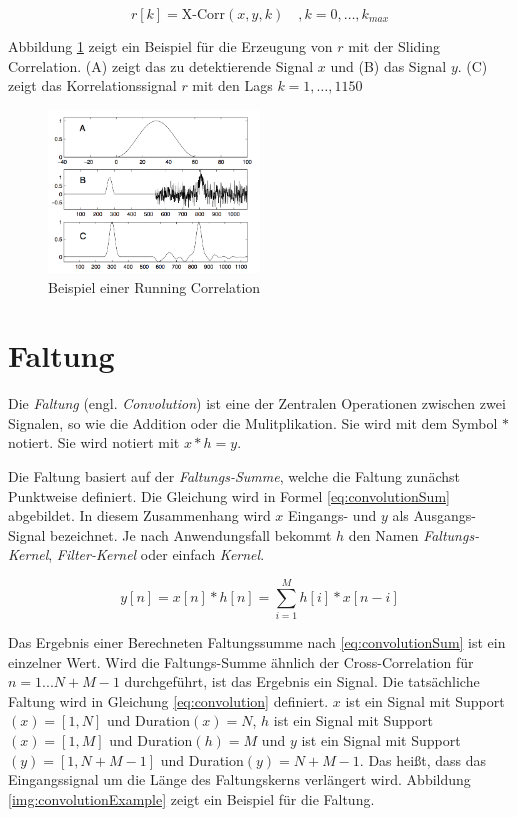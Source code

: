 \begin{equation}
r[k] = \text{X-Corr}(x,y,k) \quad, k = 0 , \ldots , k_{max} 
\label{eq:runningCorrelation}
\end{equation}

Abbildung \ref{img:slidingCorrelation} zeigt ein Beispiel für die Erzeugung von $r$ mit der Sliding Correlation. (A) zeigt das zu detektierende Signal $x$ und (B) das Signal $y$. (C) zeigt das Korrelationssignal $r$ mit den Lags $k = 1, \ldots ,1150$ \cite[S. 47 - 48]{dspMichigan}

\begin{figure}[h]
	\centering
	\includegraphics[width=0.5\textwidth]{bilder/slidingCorrelation.png}
	\caption{Beispiel einer Running Correlation}
	\label{img:slidingCorrelation}
\end{figure}

\section{Faltung}

Die \emph{Faltung} (engl. \emph{Convolution}) ist eine der Zentralen Operationen zwischen zwei Signalen, so wie die Addition oder die Mulitplikation. Sie wird mit dem Symbol $*$ notiert. Sie wird notiert mit $x* h = y$. 

Die Faltung basiert auf der \emph{Faltungs-Summe}, welche die Faltung zunächst Punktweise definiert. Die Gleichung wird in Formel \ref{eq:convolutionSum} abgebildet. In diesem Zusammenhang wird $x$ Eingangs- und $y$ als Ausgangs-Signal bezeichnet. Je nach Anwendungsfall bekommt $h$ den Namen \emph{Faltungs-Kernel}, \emph{Filter-Kernel} oder einfach \emph{Kernel}. \cite[S. 107-108]{dspGuide}

\begin{equation}
y[n] = x[n] * h[n] = \sum_{i=1}^{M} h[i] * x[n-i]
\label{eq:convolutionSum}
\end{equation}

Das Ergebnis einer Berechneten Faltungssumme nach \ref{eq:convolutionSum} ist ein einzelner Wert. Wird die Faltungs-Summe ähnlich der Cross-Correlation für $n = 1...N+M-1$ durchgeführt, ist das Ergebnis ein Signal. Die tatsächliche Faltung wird in Gleichung \ref{eq:convolution} definiert. $x$ ist ein Signal mit Support$(x) = [1,N]$ und Duration$(x) = N$, $h$ ist ein Signal mit Support$(x) = [1,M]$ und Duration$(h) = M$ und $y$ ist ein Signal mit Support$(y) = [1,N+M-1]$ und Duration$(y) = N+M-1$. Das heißt, dass das Eingangssignal um die Länge des Faltungskerns verlängert wird. Abbildung 	\ref{img:convolutionExample} zeigt ein Beispiel für die Faltung.\cite[S. 115-120]{dspGuide}


